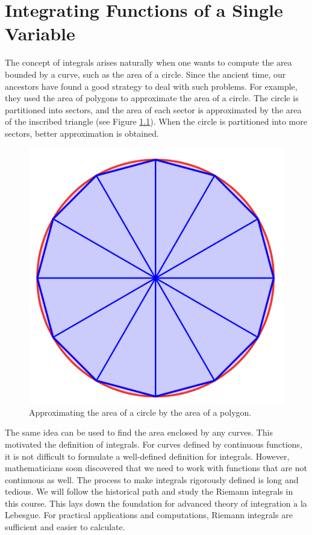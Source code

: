  
 
 

\chapter{Integrating Functions of a Single Variable}\label{ch4}

 
 

The concept of integrals arises naturally when one wants to compute the area bounded by a curve, such as the area of   a circle. Since the ancient time, our ancestors have found a good strategy to deal with such problems. For example, they used the area of polygons to approximate the area of a circle. The circle is partitioned into  sectors, and the area of each sector is approximated by the area of the inscribed triangle (see Figure \ref{figure36}). When the circle is partitioned into more sectors, better approximation is obtained.


 \begin{figure}[ht]
\centering
\includegraphics[scale=0.2]{Picture36.png}
\caption{ Approximating the area of a circle by the area of a polygon.\fa}\label{figure36}
\end{figure}

The same idea can be used to find the area enclosed by any curves. This motivated the definition of integrals. For curves defined by continuous functions, it is not difficult to formulate a well-defined definition for integrals. However, mathematicians soon discovered that we need to work with functions that are not continuous as well. The process to make integrals rigorously defined is long and tedious. We will follow the historical path and study the Riemann integrals in this course. This lays down the foundation for advanced theory of integration $\grave{\text{a}}$ la Lebesgue. For practical applications and computations, Riemann integrals are sufficient and easier to calculate.

